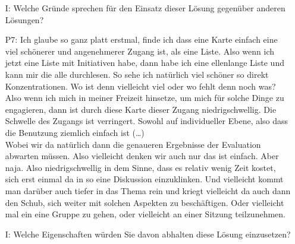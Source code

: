\begin{itemize}
Erkenntnisgewinn entwickeln. (\dots)\\
    Achso, und was mir gerade noch einf{\"a}llt. Auf den konkreten Tag bezogen, da ist die Karte nat{\"u}rlich auch sehr sch{\"o}n, um Aktionen die nur an dem Tag stattfinden hervorzuheben. Vielleicht dass man da noch eine weitere Farbe einf{\"u}gt f{\"u}r Aktionen an dem Tag. Weil die Idee ist ja auch an dem Tag, dass dieser nicht nur zentral organisiert wird, sondern auch da ist die Idee, dass die B{\"u}rger direkt partizipieren und selbst Aktionen anbieten. Oft l{\"a}uft das ja {\"u}ber so eine nachbarschaftliche Verbindung, dass da sich Beispielsweise in einem Hinterhof irgendwer etwas {\"u}berlegt hat. Und das sollen die dann da auch in die Karte mit eintragen. Das w{\"a}re dann ja eine M{\"o}glichkeit f{\"u}r die B{\"u}rger diesen Tag, oder den Ablauf des Tages, dezentral zu planen. Das ist auch so eine Sache, die ich mir da f{\"u}r den konkreten Tag verspreche. Das f{\"a}nde ich auch eine gute Funktion.
    \item[I:] Welche Gr{\"u}nde sprechen f{\"u}r den Einsatz dieser L{\"o}sung gegen{\"u}ber anderen L{\"o}sungen?
    \item[P7:] Ich glaube so ganz platt erstmal, finde ich dass eine Karte einfach eine viel sch{\"o}nerer und angenehmerer Zugang ist, als eine Liste. Also wenn ich jetzt eine Liste mit Initiativen habe, dann habe ich eine ellenlange Liste und kann mir die alle durchlesen. So sehe ich nat{\"u}rlich viel sch{\"o}ner so direkt Konzentrationen. Wo ist denn vielleicht viel oder wo fehlt denn noch was? Also wenn ich mich in meiner Freizeit hinsetze, um mich f{\"u}r solche Dinge zu engagieren, dann ist durch diese Karte dieser Zugang niedrigschwellig. Die Schwelle des Zugangs ist verringert. Sowohl auf individueller Ebene, also dass die Benutzung ziemlich einfach ist (\dots)\\
    Wobei wir da nat{\"u}rlich dann die genaueren Ergebnisse der Evaluation abwarten m{\"u}ssen. Also vielleicht denken wir auch nur das ist einfach. Aber naja. Also niedrigschwellig in dem Sinne, dass es relativ wenig Zeit kostet, sich erst einmal da in so eine Diskussion einzuklinken. Und vielleicht kommt man dar{\"u}ber auch tiefer in das Thema rein und kriegt vielleicht da auch dann den Schub, sich weiter mit solchen Aspekten zu besch{\"a}ftigen. Oder vielleicht mal ein eine Gruppe zu gehen, oder vielleicht an einer Sitzung teilzunehmen.
    \item[I:] Welche Eigenschaften w{\"u}rden Sie davon abhalten diese L{\"o}sung einzusetzen?

\end{itemize}
